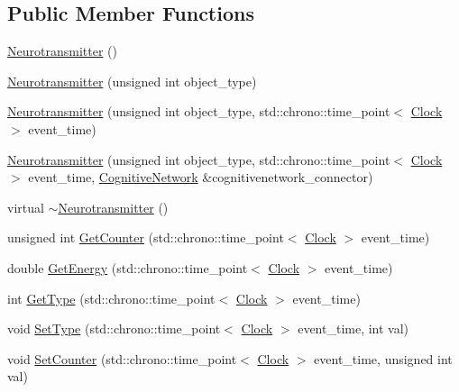 \subsection*{Public Member Functions}
\begin{DoxyCompactItemize}
\item 
\hyperlink{class_neurotransmitter_a05883c62f2c20b8034121a46c50de00f}{Neurotransmitter} ()
\item 
\hyperlink{class_neurotransmitter_adca6f02b1a9c98d269e3909e1e2f0463}{Neurotransmitter} (unsigned int object\+\_\+type)
\item 
\hyperlink{class_neurotransmitter_ac1c768a2769536a8a16569ae0dde1671}{Neurotransmitter} (unsigned int object\+\_\+type, std\+::chrono\+::time\+\_\+point$<$ \hyperlink{universe_8h_a0ef8d951d1ca5ab3cfaf7ab4c7a6fd80}{Clock} $>$ event\+\_\+time)
\item 
\hyperlink{class_neurotransmitter_ac9257a1b310a26eba8a08ffb4b93bb64}{Neurotransmitter} (unsigned int object\+\_\+type, std\+::chrono\+::time\+\_\+point$<$ \hyperlink{universe_8h_a0ef8d951d1ca5ab3cfaf7ab4c7a6fd80}{Clock} $>$ event\+\_\+time, \hyperlink{class_cognitive_network}{Cognitive\+Network} \&cognitivenetwork\+\_\+connector)
\item 
virtual \hyperlink{class_neurotransmitter_a0ea63f67dc5a49d485b7a7034a8f7968}{$\sim$\+Neurotransmitter} ()
\item 
unsigned int \hyperlink{class_neurotransmitter_a94b3d1909cdd787f0583e28e1e9b58dd}{Get\+Counter} (std\+::chrono\+::time\+\_\+point$<$ \hyperlink{universe_8h_a0ef8d951d1ca5ab3cfaf7ab4c7a6fd80}{Clock} $>$ event\+\_\+time)
\item 
double \hyperlink{class_neurotransmitter_a1e3e8134ea935f617b0afd2f7b5b5799}{Get\+Energy} (std\+::chrono\+::time\+\_\+point$<$ \hyperlink{universe_8h_a0ef8d951d1ca5ab3cfaf7ab4c7a6fd80}{Clock} $>$ event\+\_\+time)
\item 
int \hyperlink{class_neurotransmitter_a45414c0d173758edbbf9318a7eccb623}{Get\+Type} (std\+::chrono\+::time\+\_\+point$<$ \hyperlink{universe_8h_a0ef8d951d1ca5ab3cfaf7ab4c7a6fd80}{Clock} $>$ event\+\_\+time)
\item 
void \hyperlink{class_neurotransmitter_ae460ed5fac92ba136a80bba12ebce246}{Set\+Type} (std\+::chrono\+::time\+\_\+point$<$ \hyperlink{universe_8h_a0ef8d951d1ca5ab3cfaf7ab4c7a6fd80}{Clock} $>$ event\+\_\+time, int val)
\item 
void \hyperlink{class_neurotransmitter_ae16ec051609867d4f64fad5ba4449443}{Set\+Counter} (std\+::chrono\+::time\+\_\+point$<$ \hyperlink{universe_8h_a0ef8d951d1ca5ab3cfaf7ab4c7a6fd80}{Clock} $>$ event\+\_\+time, unsigned int val)

\end{DoxyCompactItemize}
